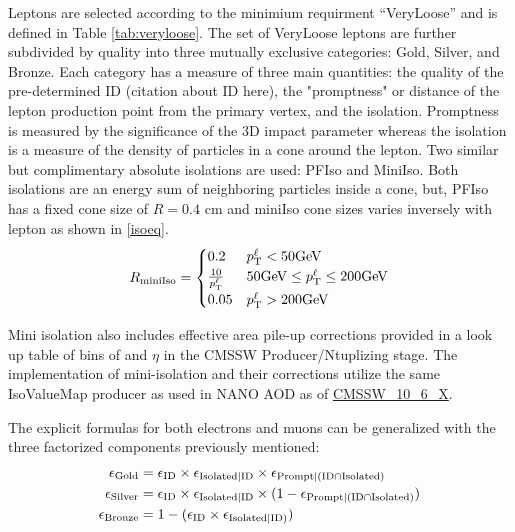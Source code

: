 Leptons are selected according to the minimium requirment ``VeryLoose'' and is defined in Table \ref{tab:veryloose}.  The set of VeryLoose leptons are further subdivided by quality into three mutually exclusive categories: Gold, Silver, and Bronze. Each category has a measure of three main quantities: the quality of the pre-determined ID (citation about ID here), the "promptness" or distance of the lepton production point from the primary vertex, and the isolation. Promptness is measured by the significance of the 3D impact parameter whereas the isolation is a measure of the density of particles in a cone around the lepton. Two similar but complimentary absolute isolations are used: PFIso and MiniIso. Both isolations are an energy sum of neighboring particles inside a cone, but, PFIso has a fixed cone size of $R=0.4$ cm  and miniIso cone sizes varies inversely with lepton \pt as shown in \ref{isoeq}.
\begin{equation}
R_{\text{miniIso}}=
    \begin{cases}
      0.2 & p_{\mathrm{T}}^\ell < 50 \text{GeV}\\
      \frac{10}{p_{\mathrm{T}}^\ell} & 50 \text{GeV} \leq p_{\mathrm{T}}^\ell \leq 200 \text{GeV} \\
      0.05 & p_{\mathrm{T}}^\ell > 200 \text{GeV}
    \end{cases}
    \label{isoeq}
\end{equation}

Mini isolation also includes effective area pile-up corrections provided in a look up table of bins of \pt and $\eta$ in the CMSSW Producer/Ntuplizing stage. The implementation of mini-isolation and their corrections utilize the same IsoValueMap producer as used in NANO AOD as of \url{CMSSW_10_6_X}.


The explicit formulas for both electrons and muons can be generalized with the three factorized components previously mentioned:
\begin{equation}\label{eq:efflep_general}
\begin{split}
\epsilon_{\text{Gold}}& = \epsilon_{\text{ID}}\times \epsilon_{\text{Isolated}|\text{ID}} \times \epsilon_{\text{Prompt}|(\text{ID} \cap \text{Isolated})} \\
\epsilon_{\text{Silver}}& = \epsilon_{\text{ID}} \times \epsilon_{\text{Isolated}|\text{ID}} \times (1-\epsilon_{\text{Prompt}|(\text{ID} \cap \text{Isolated})}) \\
\epsilon_{\text{Bronze}}& = 1-(\epsilon_{\text{ID}} \times \epsilon_{\text{Isolated}|\text{ID})} )
\end{split}
\end{equation}

